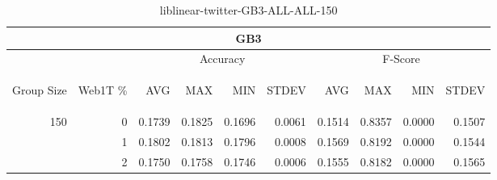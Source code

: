 \begin{center}
\begin{table}[htbp]
\begin{tabular}{ | r | r | r | r | r | r | r | r | r | r |}
\hline
\multicolumn{10}{|c|}{GB3}\\
\hline
 & & \multicolumn{4}{|c|}{Accuracy} & \multicolumn{4}{|c|}{F-Score}\\ \cline{3-10}
\begin{sideways}Group Size\end{sideways} & \begin{sideways}Web1T \%\end{sideways} & \begin{sideways}AVG\end{sideways} & \begin{sideways}MAX\end{sideways} & \begin{sideways}MIN\end{sideways} & \begin{sideways}STDEV\end{sideways} & \begin{sideways}AVG\end{sideways} & \begin{sideways}MAX\end{sideways} & \begin{sideways}MIN\end{sideways} & \begin{sideways}STDEV\end{sideways}\\
\hline
\multirow{3}{*}{150}
 & 0 & 0.1739 & 0.1825 & 0.1696 & 0.0061 & 0.1514 & 0.8357 & 0.0000 & 0.1507\\ \cline{2-10}
 & 1 & 0.1802 & 0.1813 & 0.1796 & 0.0008 & 0.1569 & 0.8192 & 0.0000 & 0.1544\\ \cline{2-10}
 & 2 & 0.1750 & 0.1758 & 0.1746 & 0.0006 & 0.1555 & 0.8182 & 0.0000 & 0.1565\\ \cline{2-10}
\hline
\end{tabular}
\caption{liblinear-twitter-GB3-ALL-ALL-150}
\end{table}
\end{center}


